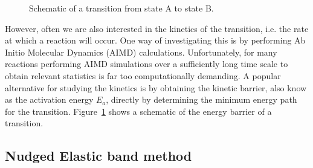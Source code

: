 \begin{refsection}
\begin{figure}[ht] 
\centering
{} 
 
\caption{\label{dft:fig-transition}Schematic of a transition from state A to state 
B.} 
\end{figure} 
 
However, often we are also interested in the kinetics of the transition, i.e. the 
rate at which a reaction will occur. One way of investigating this is by 
performing Ab Initio Molecular Dynamics (AIMD) calculations. Unfortunately, 
for many reactions performing AIMD simulations over a sufficiently long time 
scale to obtain relevant statistics is far too computationally demanding. A 
popular alternative for studying the kinetics is by obtaining the kinetic barrier, 
also know as the activation energy $E_a$, directly  
by determining the minimum energy path for the 
transition. Figure~\ref{dft:fig-transition} shows a schematic of the energy 
barrier of a transition. 
 
\subsection{Nudged Elastic band method} \label{dft:sec-neb} 
 

\end{refsection}
